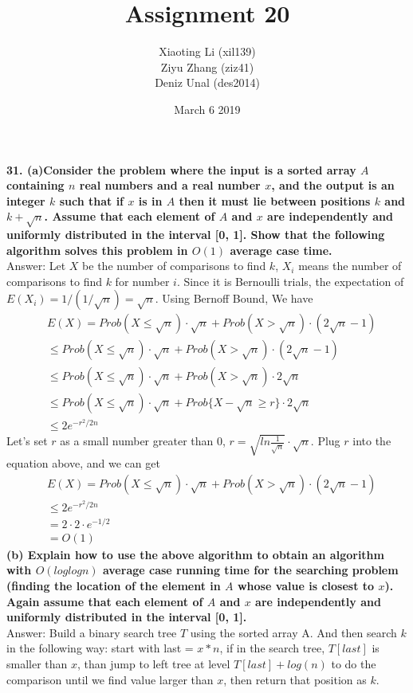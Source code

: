 \documentclass{article}
\title{Assignment 20}
\author{Xiaoting Li (xil139) \\
Ziyu Zhang (ziz41) \\
Deniz Unal (des2014)}
\date{March 6 2019}
\begin{document}
\maketitle

\noindent
\textbf{31. (a)Consider the problem where the input is a sorted array $A$ containing $n$ real numbers and a real number $x$, and the output is an integer $k$ such that if $x$ is in $A$ then it must lie between positions $k$ and $k + \sqrt{n}$. Assume that each element of $A$ and $x$ are independently and uniformly distributed in the interval [0, 1]. Show that the following algorithm solves this problem in $O(1)$ average case time.} \\ \newline 
Answer: Let $X$ be the number of comparisons to find $k$, $X_i$ means the number of comparisons to find $k$ for number $i$. Since it is Bernoulli trials, the expectation of $E(X_i) = 1/(1/\sqrt{n}) = \sqrt{n}$. Using Bernoff Bound, We have
\begin{align*}
&E(X) = Prob(X \leq \sqrt{n})\cdot \sqrt{n} + Prob(X > \sqrt{n})\cdot(2\sqrt{n} - 1) \\
&\leq Prob(X \leq \sqrt{n})\cdot \sqrt{n} + Prob(X > \sqrt{n}) \cdot (2\sqrt{n} - 1)\\
&\leq Prob(X \leq \sqrt{n})\cdot \sqrt{n} + Prob(X > \sqrt{n}) \cdot 2\sqrt{n}\\
&\leq Prob(X \leq \sqrt{n})\cdot \sqrt{n} + Prob\{X - \sqrt{n}\geq r\}\cdot 2\sqrt{n}\\
&\leq 2e^{-r^2/2n}
\end{align*}
Let's set $r$ as a small number greater than 0, $r = \sqrt{ln\frac{1}{\sqrt{n}}}\cdot \sqrt{n}$. Plug $r$ into the equation above, and we can get 
\begin{align*}
&E(X) = Prob(X \leq \sqrt{n})\cdot \sqrt{n} + Prob(X > \sqrt{n})\cdot(2\sqrt{n} - 1)\\
&\leq 2e^{-r^2/2n}\\
&=2\cdot2\cdot e^{-1/2}\\
&= O(1)
\end{align*}\newline
\textbf{(b) Explain how to use the above algorithm to obtain an algorithm with $O(log log n)$ average case running time for the searching problem (finding the location of the element in $A$ whose value is closest to $x$). Again assume that each element of $A$ and $x$ are independently and uniformly distributed in the interval [0, 1].}\\ \newline
Answer: Build a binary search tree $T$ using the sorted array A. And then search $k$ in the following way: start with last = $x*n$, if in the search tree, $T[last]$ is smaller than $x$, than jump to left tree at level $T[last] + log(n)$ to do the comparison until we find value larger than $x$, then return that position as $k$. 
\end{document}
